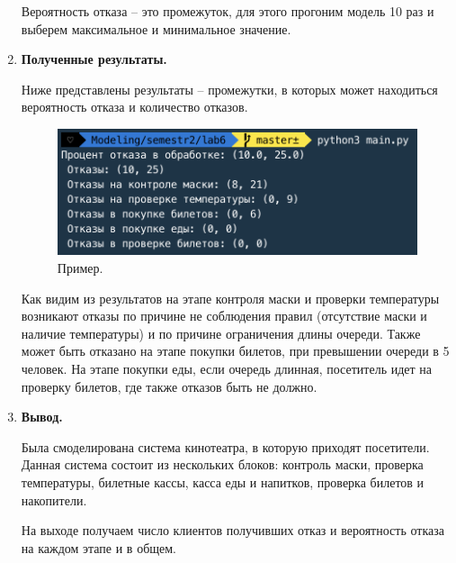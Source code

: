 \documentclass[a4paper,14pt]{extreport} %
\begin{document}
\begin{enumerate}
Вероятность отказа -- это промежуток, для этого прогоним модель 10 раз и выберем максимальное и минимальное значение. 

\item \textbf{Полученные результаты. }

Ниже представлены результаты -- промежутки, в которых может находиться вероятность отказа и количество отказов. 

\begin{figure}[H]
  \centering
  \includegraphics[scale=0.7]{1}
  \caption{Пример. }
\end{figure}

Как видим из результатов на этапе контроля маски и проверки температуры возникают отказы по причине не соблюдения правил (отсутствие маски и наличие температуры) и по причине ограничения длины очереди. Также может быть отказано на этапе покупки билетов, при превышении очереди в 5 человек. На этапе покупки еды, если очередь длинная, посетитель идет на проверку билетов, где также отказов быть не должно. 

\item \textbf{Вывод. }

Была смоделирована система кинотеатра, в которую приходят посетители. Данная система состоит из нескольких блоков: контроль маски, проверка температуры, билетные кассы, касса еды и напитков, проверка билетов и накопители. 

На выходе получаем число клиентов получивших отказ и вероятность отказа на каждом этапе и в общем. 

\end{enumerate}
\end{document}

